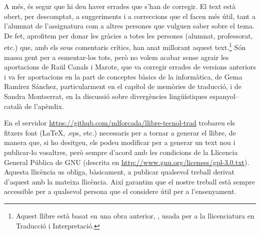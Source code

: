   A més, és segur que hi deu haver errades que s'han de corregir. El
  text està obert, per descomptat, a suggeriments i a correccions que
  el facen més útil, tant a l'alumnat de l'assignatura com a altres
  persones que vulguen saber sobre el tema.  De fet, aprofitem per
  donar les gràcies a totes les persones (alumnat, professorat, etc.)
  que, amb els seus comentaris crítics, han anat millorant aquest
  text.\footnote{Aquest llibre està basat en una obra anterior,
    \protect\citep{forcada09b}, usada per a la llicenciatura en
    Traducció i Interpretació.}  Són massa gent per a esmentar-los
  tots, però no volem acabar sense agrair les aportacions de Raül
  Canals i Marote, que va corregir errades de versions anteriors i va
  fer aportacions en la part de conceptes bàsics de la informàtica, de
  Gema Ramírez Sánchez, particularment en el capítol de memòries de
  traducció, i de Sandra Montserrat, en la discussió sobre
  divergències lingüístiques espanyol--català de l'apèndix.

  En el servidor \url{https://github.com/mlforcada/llibre-tecnol-trad}
  trobareu els fitxers font (\LaTeX, .eps, etc.) necessaris per a
  tornar a generar el llibre, de manera que, si ho desitgeu, els podeu
  modificar per a generar un text nou i publicar-lo vosaltres, però
  sempre d'acord amb les condicions de la Llicencia General Pública de
  GNU (descrita en
  \url{http://www.gnu.org/licenses/gpl-3.0.txt}). Aquesta llicència us
  obliga, bàsicament, a publicar qualsevol treball derivat d'aquest
  amb la mateixa llicència. Així garantim que el nostre treball està
  sempre accessible per a qualsevol persona que el considere útil per
  a l'ensenyament.

